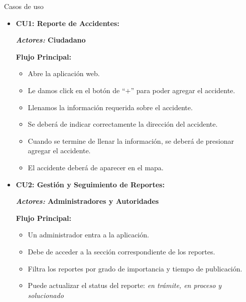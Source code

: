 {\Large \color{Naranja}Casos de uso}





\begin{itemize}[label=\textcolor{Lotus}{$\triangleright$}]
    \item {
        \textbf{\color{Purpura}CU1: Reporte de Accidentes:}

        \textbf{\textit{Actores:} Ciudadano}

        \textbf{Flujo Principal:}
    
        \begin{itemize}[label=\textcolor{Amarillo}{$\triangleright$}]
            \item Abre la aplicación web.
            \item Le damos click en el botón de ``$+$'' para poder agregar el accidente.
            \item Llenamos la información requerida sobre el accidente.
            \item Se deberá de indicar correctamente la dirección del accidente.
            \item Cuando se termine de llenar la información, se deberá de presionar agregar el accidente.
            \item El accidente deberá de aparecer en el mapa.
        \end{itemize}
    }
    
    \item {
        \textbf{\color{Purpura}CU2: Gestión y Seguimiento de Reportes:}

        \textbf{\textit{Actores:} Administradores y  Autoridades}

        \textbf{Flujo Principal:}

        \begin{itemize}[label=\textcolor{Amarillo}{$\triangleright$}]
            \item Un administrador entra a la aplicación.
            \item Debe de acceder a la sección correspondiente de los reportes.
            \item Filtra los reportes por grado de importancia y tiempo de publicación.
            \item Puede actualizar el status del reporte: \textit{en trámite, en proceso y solucionado} 
        \end{itemize}
    }
    

\end{itemize}
